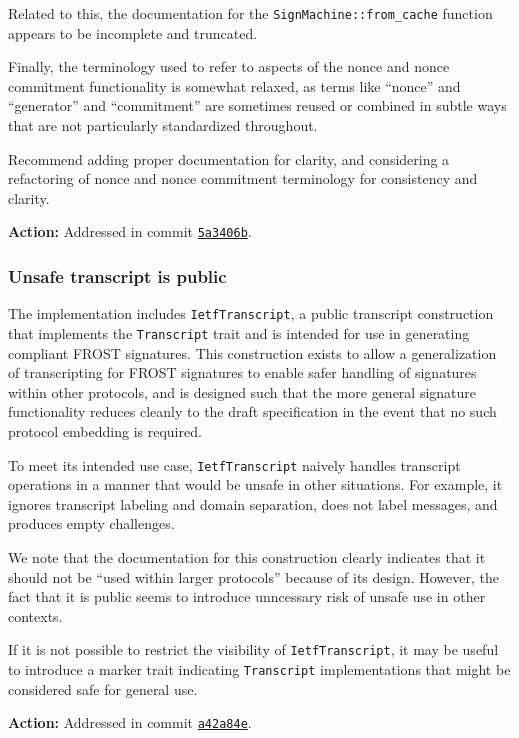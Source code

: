 \documentclass{article}
\begin{document}
Related to this, the documentation for the \texttt{SignMachine::from\_cache} function appears to be incomplete and truncated.

Finally, the terminology used to refer to aspects of the nonce and nonce commitment functionality is somewhat relaxed, as terms like ``nonce'' and ``generator'' and ``commitment'' are sometimes reused or combined in subtle ways that are not particularly standardized throughout.

Recommend adding proper documentation for clarity, and considering a refactoring of nonce and nonce commitment terminology for consistency and clarity.

\textbf{Action:} Addressed in commit \href{https://github.com/serai-dex/serai/commit/5a3406bb5f483dd84efc2eea34ab6092ca13bf10}{\texttt{5a3406b}}.


\subsubsection{Unsafe transcript is public}

The implementation includes \texttt{IetfTranscript}, a public transcript construction that implements the \texttt{Transcript} trait and is intended for use in generating compliant FROST signatures.
This construction exists to allow a generalization of transcripting for FROST signatures to enable safer handling of signatures within other protocols, and is designed such that the more general signature functionality reduces cleanly to the draft specification in the event that no such protocol embedding is required.

To meet its intended use case, \texttt{IetfTranscript} naively handles transcript operations in a manner that would be unsafe in other situations.
For example, it ignores transcript labeling and domain separation, does not label messages, and produces empty challenges.

We note that the documentation for this construction clearly indicates that it should not be ``used within larger protocols'' because of its design.
However, the fact that it is public seems to introduce unncessary risk of unsafe use in other contexts.

If it is not possible to restrict the visibility of \texttt{IetfTranscript}, it may be useful to introduce a marker trait indicating \texttt{Transcript} implementations that might be considered safe for general use.

\textbf{Action:} Addressed in commit \href{https://github.com/serai-dex/serai/commit/a42a84e1e8adb83451d70fe9d9e66cd47aba85da}{\texttt{a42a84e}}.
\end{document}

